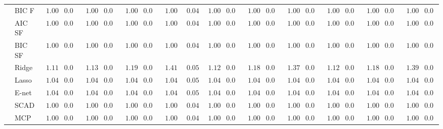 \begin{tabular}{ll|ll|llllll|llllll|llllll}
	& BIC F  & $\phantom{0}1.00$ & $0.04$ & $\phantom{0}1.00$ & $0.04$ & $\phantom{0}1.00$ & $0.04$ & $\phantom{0}1.00$ & $\phantom{0}0.04$ & $\phantom{0}1.00$ & $0.04$ & $\phantom{0}1.00$ & $0.04$ & $\phantom{0}1.00$ & $0.04$ & $\phantom{0}1.00$ & $0.04$ & $\phantom{0}1.00$ & $0.04$ & $\phantom{0}1.00$ & $0.04$ \\
	& AIC SF  & $\phantom{0}1.00$ & $0.04$ & $\phantom{0}1.00$ & $0.04$ & $\phantom{0}1.00$ & $0.04$ & $\phantom{0}1.00$ & $\phantom{0}0.04$ & $\phantom{0}1.00$ & $0.04$ & $\phantom{0}1.00$ & $0.04$ & $\phantom{0}1.00$ & $0.04$ & $\phantom{0}1.00$ & $0.04$ & $\phantom{0}1.00$ & $0.04$ & $\phantom{0}1.00$ & $0.04$ \\
	& BIC SF  & $\phantom{0}1.00$ & $0.04$ & $\phantom{0}1.00$ & $0.04$ & $\phantom{0}1.00$ & $0.04$ & $\phantom{0}1.00$ & $\phantom{0}0.04$ & $\phantom{0}1.00$ & $0.04$ & $\phantom{0}1.00$ & $0.04$ & $\phantom{0}1.00$ & $0.04$ & $\phantom{0}1.00$ & $0.04$ & $\phantom{0}1.00$ & $0.04$ & $\phantom{0}1.00$ & $0.04$ \\
	& Ridge  & $\phantom{0}1.11$ & $0.05$ & $\phantom{0}1.13$ & $0.05$ & $\phantom{0}1.19$ & $0.05$ & $\phantom{0}1.41$ & $\phantom{0}0.05$ & $\phantom{0}1.12$ & $0.05$ & $\phantom{0}1.18$ & $0.05$ & $\phantom{0}1.37$ & $0.05$ & $\phantom{0}1.12$ & $0.05$ & $\phantom{0}1.18$ & $0.05$ & $\phantom{0}1.39$ & $0.05$ \\
	& Lasso  & $\phantom{0}1.04$ & $0.05$ & $\phantom{0}1.04$ & $0.05$ & $\phantom{0}1.04$ & $0.05$ & $\phantom{0}1.04$ & $\phantom{0}0.05$ & $\phantom{0}1.04$ & $0.05$ & $\phantom{0}1.04$ & $0.05$ & $\phantom{0}1.04$ & $0.05$ & $\phantom{0}1.04$ & $0.05$ & $\phantom{0}1.04$ & $0.05$ & $\phantom{0}1.04$ & $0.05$ \\
	& E-net  & $\phantom{0}1.04$ & $0.05$ & $\phantom{0}1.04$ & $0.05$ & $\phantom{0}1.04$ & $0.05$ & $\phantom{0}1.04$ & $\phantom{0}0.05$ & $\phantom{0}1.04$ & $0.05$ & $\phantom{0}1.04$ & $0.05$ & $\phantom{0}1.04$ & $0.05$ & $\phantom{0}1.04$ & $0.05$ & $\phantom{0}1.04$ & $0.05$ & $\phantom{0}1.04$ & $0.05$ \\
	& SCAD  & $\phantom{0}1.00$ & $0.04$ & $\phantom{0}1.00$ & $0.04$ & $\phantom{0}1.00$ & $0.04$ & $\phantom{0}1.00$ & $\phantom{0}0.04$ & $\phantom{0}1.00$ & $0.04$ & $\phantom{0}1.00$ & $0.04$ & $\phantom{0}1.00$ & $0.04$ & $\phantom{0}1.00$ & $0.04$ & $\phantom{0}1.00$ & $0.04$ & $\phantom{0}1.00$ & $0.04$ \\
	& MCP  & $\phantom{0}1.00$ & $0.04$ & $\phantom{0}1.00$ & $0.04$ & $\phantom{0}1.00$ & $0.04$ & $\phantom{0}1.00$ & $\phantom{0}0.04$ & $\phantom{0}1.00$ & $0.04$ & $\phantom{0}1.00$ & $0.04$ & $\phantom{0}1.00$ & $0.04$ & $\phantom{0}1.00$ & $0.04$ & $\phantom{0}1.00$ & $0.04$ & $\phantom{0}1.00$ & $0.04$ \\

\end{tabular}
